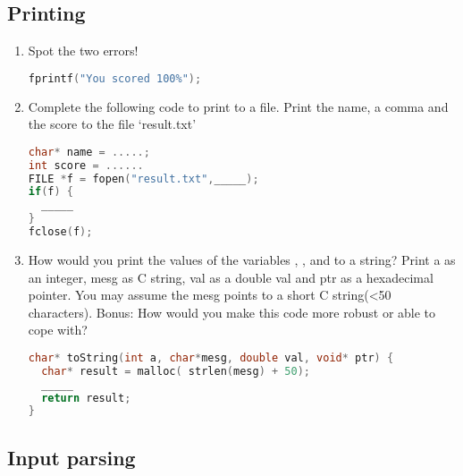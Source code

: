\subsection{Printing}

\begin{enumerate}

\item Spot the two errors!

\begin{lstlisting}[language=C]
fprintf("You scored 100%");
\end{lstlisting}

\item Complete the following code to print to a file. Print the name, a comma and the score to the file `result.txt'

\begin{lstlisting}[language=C]
char* name = .....;
int score = ......
FILE *f = fopen("result.txt",_____);
if(f) {
  _____
}
fclose(f);
\end{lstlisting}

\item How would you print the values of the variables , ,  and  to a string? Print a as an integer, mesg as C string, val as a double val and ptr as a hexadecimal pointer. You may assume the mesg points to a short C string(\textless{}50 characters). Bonus: How would you make this code more robust or able to cope with?

\begin{lstlisting}[language=C]
char* toString(int a, char*mesg, double val, void* ptr) {
  char* result = malloc( strlen(mesg) + 50);
  _____
  return result;
}
\end{lstlisting}

\end{enumerate}

\subsection{Input parsing}

